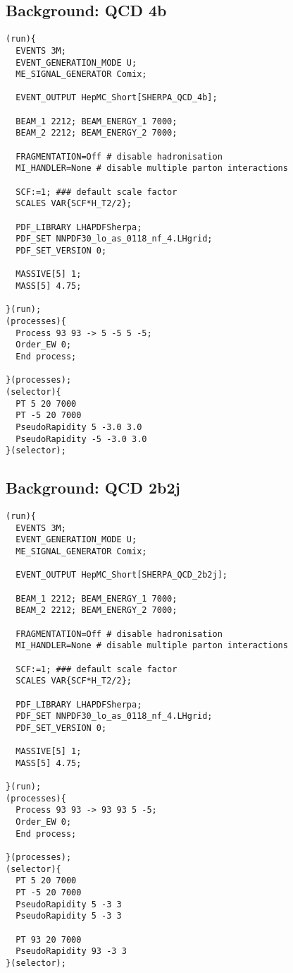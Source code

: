 \documentclass[12pt]{article}
\begin{document}
\subsection {Background: QCD 4b}
\begin{verbatim}
(run){
  EVENTS 3M;
  EVENT_GENERATION_MODE U;
  ME_SIGNAL_GENERATOR Comix;

  EVENT_OUTPUT HepMC_Short[SHERPA_QCD_4b];

  BEAM_1 2212; BEAM_ENERGY_1 7000;
  BEAM_2 2212; BEAM_ENERGY_2 7000;

  FRAGMENTATION=Off # disable hadronisation
  MI_HANDLER=None # disable multiple parton interactions

  SCF:=1; ### default scale factor
  SCALES VAR{SCF*H_T2/2};

  PDF_LIBRARY LHAPDFSherpa;
  PDF_SET NNPDF30_lo_as_0118_nf_4.LHgrid;
  PDF_SET_VERSION 0;

  MASSIVE[5] 1;
  MASS[5] 4.75;

}(run);
(processes){
  Process 93 93 -> 5 -5 5 -5;
  Order_EW 0;
  End process;

}(processes);
(selector){
  PT 5 20 7000
  PT -5 20 7000
  PseudoRapidity 5 -3.0 3.0
  PseudoRapidity -5 -3.0 3.0
}(selector);
\end{verbatim}

\subsection {Background: QCD 2b2j}
\begin{verbatim}
(run){
  EVENTS 3M;
  EVENT_GENERATION_MODE U;
  ME_SIGNAL_GENERATOR Comix;

  EVENT_OUTPUT HepMC_Short[SHERPA_QCD_2b2j];

  BEAM_1 2212; BEAM_ENERGY_1 7000;
  BEAM_2 2212; BEAM_ENERGY_2 7000;

  FRAGMENTATION=Off # disable hadronisation
  MI_HANDLER=None # disable multiple parton interactions

  SCF:=1; ### default scale factor
  SCALES VAR{SCF*H_T2/2};

  PDF_LIBRARY LHAPDFSherpa;
  PDF_SET NNPDF30_lo_as_0118_nf_4.LHgrid;
  PDF_SET_VERSION 0;

  MASSIVE[5] 1;
  MASS[5] 4.75;

}(run);
(processes){
  Process 93 93 -> 93 93 5 -5;
  Order_EW 0;
  End process;

}(processes);
(selector){
  PT 5 20 7000
  PT -5 20 7000
  PseudoRapidity 5 -3 3
  PseudoRapidity 5 -3 3

  PT 93 20 7000
  PseudoRapidity 93 -3 3
}(selector);
\end{verbatim}
\end{document}
